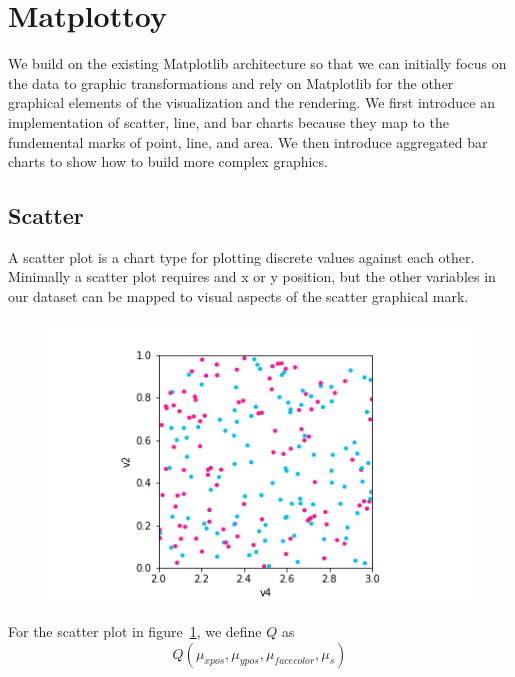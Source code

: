 \documentclass[../main.tex]{subfiles}
\begin{document}
    

\section{Matplottoy}

We build on the existing Matplotlib architecture \cite{hunterMatplotlib2DGraphics2007} so that we can initially focus on the data to graphic transformations and rely on Matplotlib for the other graphical elements of the visualization and the rendering. We first introduce an implementation of scatter, line, and bar charts because they map to the fundemental marks of point, line, and area. We then introduce aggregated bar charts to show how to build more complex graphics.  

\subsection{Scatter}
 A scatter plot \cite{friendlyBriefHistoryData2006a,tukeyExploratoryDataAnalysis1977} is a chart type for plotting discrete values against each other. Minimally a scatter plot requires and x or y position, but the other variables in our dataset can be mapped to visual aspects of the scatter graphical mark. 
\begin{figure}[H]
    \includegraphics[width=\textwidth]{figures/code/scatter_0.png}
    \label{fig:scatter}
\end{figure}

For the scatter plot in figure~\ref{fig:scatter}, we define $Q$ as 
 \begin{equation}
    Q(\mu_{xpos}, \mu_{ypos}, \mu_{facecolor}, \mu_{s})
 \end{equation}
\end{document}

